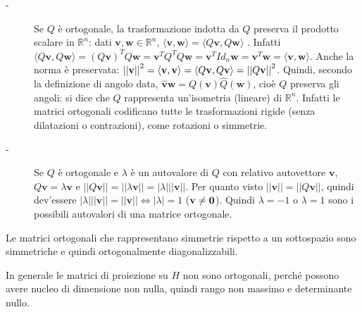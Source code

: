 \documentclass{article}
\begin{document}
\begin{description}
\item[-] Se $Q$ \`{e} ortogonale, la trasformazione indotta da $Q$ preserva
il prodotto scalare in $%
\mathbb{R}
^{n}$: dati $\mathbf{v,w}\in 
\mathbb{R}
^{n}$, $\langle \mathbf{v,w}\rangle =\langle Q\mathbf{v},Q\mathbf{w}\rangle $%
. Infatti $\langle Q\mathbf{v},Q\mathbf{w}\rangle =\left( Q\mathbf{v}\right)
^{T}Q\mathbf{w}=\mathbf{v}^{T}Q^{T}Q\mathbf{w=v}^{T}Id_{n}\mathbf{w=v}^{T}%
\mathbf{w=}\langle \mathbf{v,w}\rangle $. Anche la norma \`{e} preservata: $%
\left\vert \left\vert \mathbf{v}\right\vert \right\vert ^{2}=\langle \mathbf{%
v,v}\rangle =\langle Q\mathbf{v},Q\mathbf{v}\rangle =\left\vert \left\vert Q%
\mathbf{v}\right\vert \right\vert ^{2}$. Quindi, secondo la definizione di
angolo data, $\mathbf{\hat{v}w}=Q\left( \mathbf{v}\right) \hat{Q}\left( 
\mathbf{w}\right) $, cio\`{e} $Q$ preserva gli angoli: si dice che $Q$
rappresenta un'isometria (lineare) di $%
\mathbb{R}
^{n}$. Infatti le matrici ortogonali codificano tutte le trasformazioni
rigide (senza dilatazioni o contrazioni), come rotazioni o simmetrie.

\item[-] Se $Q$ \`{e} ortogonale e $\lambda $ \`{e} un autovalore di $Q$ con
relativo autovettore $\mathbf{v}$, $Q\mathbf{v}=\lambda \mathbf{v}$ e $%
\left\vert \left\vert Q\mathbf{v}\right\vert \right\vert =\left\vert
\left\vert \lambda \mathbf{v}\right\vert \right\vert =\left\vert \lambda
\right\vert \left\vert \left\vert \mathbf{v}\right\vert \right\vert $. Per
quanto visto $\left\vert \left\vert \mathbf{v}\right\vert \right\vert
=\left\vert \left\vert Q\mathbf{v}\right\vert \right\vert $, quindi
dev'essere $\left\vert \lambda \right\vert \left\vert \left\vert \mathbf{v}%
\right\vert \right\vert =\left\vert \left\vert \mathbf{v}\right\vert
\right\vert \Longleftrightarrow \left\vert \lambda \right\vert =1$ ($\mathbf{%
v\neq 0}$). Quindi $\lambda =-1$ o $\lambda =1$ sono i possibili autovalori
di una matrice ortogonale.
\end{description}

Le matrici ortogonali che rappresentano simmetrie rispetto a un sottospazio
sono simmetriche e quindi ortogonalmente diagonalizzabili.

In generale le matrici di proiezione su $H$ non sono ortogonali, perch\'{e}
possono avere nucleo di dimensione non nulla, quindi rango non massimo e
determinante nullo.
\end{document}
